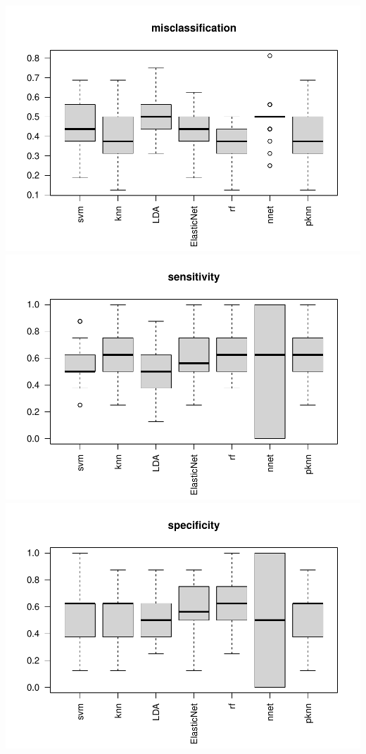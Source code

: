 \documentclass[
]{article}
\begin{document}
\includegraphics{Classification-of-disease-status-with-machine-learning-methods_files/figure-latex/compare-1.pdf}
\includegraphics{Classification-of-disease-status-with-machine-learning-methods_files/figure-latex/compare-2.pdf}
\includegraphics{Classification-of-disease-status-with-machine-learning-methods_files/figure-latex/compare-3.pdf}
\end{document}
